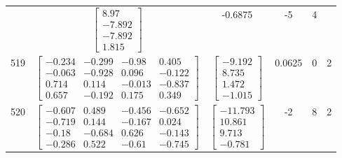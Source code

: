 \documentclass[a4paper,12pt]{article}
\begin{document}
\begin{tabular}{c c c c c c}
&
$\begin{bmatrix} 8.97 \\ -7.892 \\ -7.892 \\ 1.815 \end{bmatrix}$
&
-0.6875
&
-5
&
4
\\
519
&
$\begin{bmatrix} -0.234 & -0.299 & -0.98 & 0.405 \\ -0.063 & -0.928 & 0.096 & -0.122 \\ 0.714 & 0.114 & -0.013 & -0.837 \\ 0.657 & -0.192 & 0.175 & 0.349 \end{bmatrix}$
&
$\begin{bmatrix} -9.192 \\ 8.735 \\ 1.472 \\ -1.015 \end{bmatrix}$
&
0.0625
&
0
&
2
\\
520
&
$\begin{bmatrix} -0.607 & 0.489 & -0.456 & -0.652 \\ -0.719 & 0.144 & -0.167 & 0.024 \\ -0.18 & -0.684 & 0.626 & -0.143 \\ -0.286 & 0.522 & -0.61 & -0.745 \end{bmatrix}$
&
$\begin{bmatrix} -11.793 \\ 10.861 \\ 9.713 \\ -0.781 \end{bmatrix}$
&
-2
&
8
&
2
\\
\end{tabular} \egroup \newpage
\end{document}
